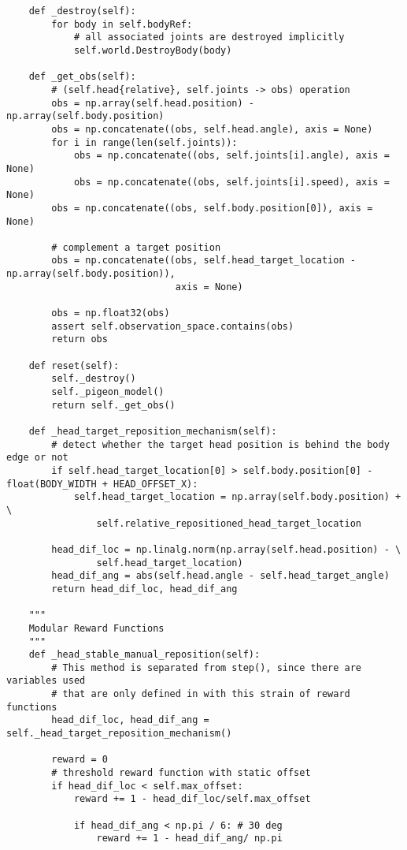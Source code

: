 \begin{lstlisting}
    def _destroy(self):
        for body in self.bodyRef:
            # all associated joints are destroyed implicitly
            self.world.DestroyBody(body)

    def _get_obs(self):
        # (self.head{relative}, self.joints -> obs) operation
        obs = np.array(self.head.position) - np.array(self.body.position)
        obs = np.concatenate((obs, self.head.angle), axis = None)
        for i in range(len(self.joints)):
            obs = np.concatenate((obs, self.joints[i].angle), axis = None)
            obs = np.concatenate((obs, self.joints[i].speed), axis = None)
        obs = np.concatenate((obs, self.body.position[0]), axis = None)

        # complement a target position
        obs = np.concatenate((obs, self.head_target_location - np.array(self.body.position)),
                              axis = None)

        obs = np.float32(obs)
        assert self.observation_space.contains(obs)
        return obs

    def reset(self):
        self._destroy()
        self._pigeon_model()
        return self._get_obs()

    def _head_target_reposition_mechanism(self):
        # detect whether the target head position is behind the body edge or not
        if self.head_target_location[0] > self.body.position[0] - float(BODY_WIDTH + HEAD_OFFSET_X):
            self.head_target_location = np.array(self.body.position) + \
                self.relative_repositioned_head_target_location

        head_dif_loc = np.linalg.norm(np.array(self.head.position) - \
                self.head_target_location)
        head_dif_ang = abs(self.head.angle - self.head_target_angle)
        return head_dif_loc, head_dif_ang

    """
    Modular Reward Functions
    """
    def _head_stable_manual_reposition(self):
        # This method is separated from step(), since there are variables used
        # that are only defined in with this strain of reward functions
        head_dif_loc, head_dif_ang = self._head_target_reposition_mechanism()

        reward = 0
        # threshold reward function with static offset
        if head_dif_loc < self.max_offset:
            reward += 1 - head_dif_loc/self.max_offset

            if head_dif_ang < np.pi / 6: # 30 deg
                reward += 1 - head_dif_ang/ np.pi


\end{lstlisting}
